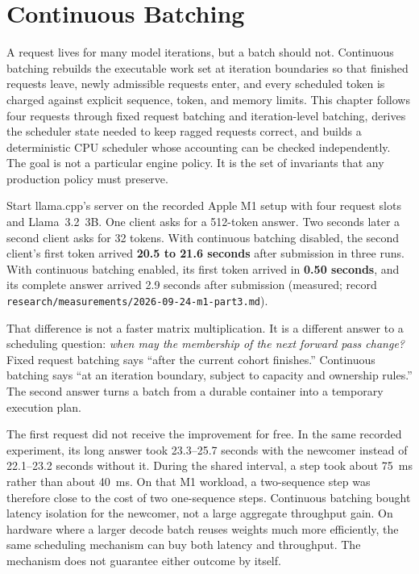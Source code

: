 \chapter{Continuous Batching}\label{ch:continuous-batching}

\begin{ChapterIntent}
A request lives for many model iterations, but a batch should not. Continuous
batching rebuilds the executable work set at iteration boundaries so that
finished requests leave, newly admissible requests enter, and every scheduled
token is charged against explicit sequence, token, and memory limits. This
chapter follows four requests through fixed request batching and
iteration-level batching, derives the scheduler state needed to keep ragged
requests correct, and builds a deterministic CPU scheduler whose accounting can
be checked independently. The goal is not a particular engine policy. It is
the set of invariants that any production policy must preserve.
\end{ChapterIntent}


Start llama.cpp's server on the recorded Apple M1 setup with four request
slots and Llama~3.2~3B. One client asks for a 512-token answer. Two seconds
later a second client asks for 32 tokens. With continuous batching disabled,
the second client's first token arrived \textbf{20.5 to 21.6 seconds} after
submission in three runs. With continuous batching enabled, its first token
arrived in \textbf{0.50 seconds}, and its complete answer arrived 2.9 seconds
after submission (measured; record
\texttt{research/measurements/2026-09-24-m1-part3.md}).

That difference is not a faster matrix multiplication. It is a different
answer to a scheduling question: \emph{when may the membership of the next
forward pass change?} Fixed request batching says ``after the current cohort
finishes.'' Continuous batching says ``at an iteration boundary, subject to
capacity and ownership rules.'' The second answer turns a batch from a durable
container into a temporary execution plan.

The first request did not receive the improvement for free. In the same
recorded experiment, its long answer took 23.3--25.7 seconds with the newcomer
instead of 22.1--23.2 seconds without it. During the shared interval, a step
took about 75~ms rather than about 40~ms. On that M1 workload, a two-sequence
step was therefore close to the cost of two one-sequence steps. Continuous
batching bought latency isolation for the newcomer, not a large aggregate
throughput gain. On hardware where a larger decode batch reuses weights much
more efficiently, the same scheduling mechanism can buy both latency and
throughput. The mechanism does not guarantee either outcome by itself.

